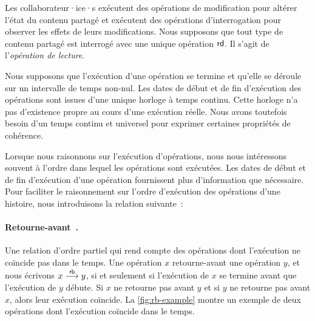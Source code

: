 Les collaborateur·ice·s exécutent des opérations de modification pour altérer l'état du contenu partagé et exécutent des opérations d'interrogation pour observer les effets de leurs modifications.
Nous supposons que tout type de contenu partagé est interrogé avec une unique opération $\operatorname{\mathsf{rd}}$.
Il s'agit de l'\emph{opération de lecture}.

Nous supposons que l'exécution d'une opération se termine et qu'elle se déroule sur un intervalle de temps non-nul.
Les dates de début et de fin d'exécution des opérations sont issues d'une unique horloge à temps continu.
Cette horloge n'a pas d'existence propre au cours d'une exécution réelle.
Nous avons toutefois besoin d'un temps continu et universel pour exprimer certaines propriétés de cohérence.

Lorsque nous raisonnons sur l'exécution d'opérations, nous nous intéressons souvent à l'ordre dans lequel les opérations sont exécutées.
Les dates de début et de fin d'exécution d'une opération fournissent plus d'information que nécessaire.
Pour faciliter le raisonnement sur l'ordre d'exécution des opérations d'une histoire, nous introduisons la relation suivante~:

\paragraph{Retourne-avant~\autocite{burckhardt_eventualconsistency_2014}.} Une relation d'ordre partiel qui rend compte des opérations dont l'exécution ne coïncide pas dans le temps.
Une opération $x$ retourne-avant une opération $y$, et nous écrivons $x \overset{\mathsf{rb}}{\longrightarrow} y$, si et seulement si l'exécution de $x$ se termine avant que l'exécution de $y$ débute.
Si $x$ ne retourne pas avant $y$ et si $y$ ne retourne pas avant $x$, alors leur exécution coïncide.
La \autoref{fig:rb-example} montre un exemple de deux opérations dont l'exécution coïncide dans le temps.

\clearpage %


